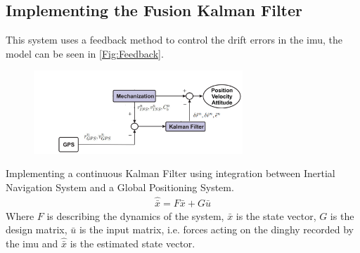 \subsection{Implementing the Fusion Kalman Filter}
This system uses a feedback method to control the drift errors in the \gls{imu}, the model can be seen in \autoref{Fig:Feedback}.
\begin{figure}[H]
\centering
\includegraphics[width=0.7\textwidth]{Figures/feed-back.png}
\label{Fig:Feedback}
\end{figure}
Implementing a continuous Kalman Filter using integration between Inertial Navigation System and a Global Positioning System.
\begin{align}
\hat{\bar{x}} = F \bar{x} + G \bar{u}
\label{eq.state_1}
\end{align}
Where $F$ is describing the dynamics of the system, $\bar{x}$ is the state vector, $G$ is the design matrix, $\bar{u}$ is the input matrix, i.e. forces acting on the dinghy recorded by the \gls{imu} and $\hat{\bar{x}}$ is the estimated state vector. 

